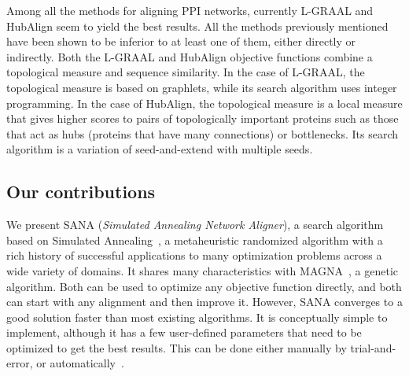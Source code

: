 \documentclass{bioinfo}
\begin{document}
Among all the methods for aligning PPI networks, currently L-GRAAL \citep{LGRAAL} and HubAlign \citep{HubAlign} seem to yield the best results. All the methods previously mentioned have been shown to be inferior to at least one of them, either directly or indirectly. Both the L-GRAAL and HubAlign objective functions combine a topological measure and sequence similarity. In the case of L-GRAAL, the topological measure is based on graphlets, while its search algorithm uses integer programming. In the case of HubAlign, the topological measure is a local measure that gives higher scores to pairs of topologically important proteins such as those that act as hubs (proteins that have many connections) or bottlenecks. Its search algorithm is a variation of seed-and-extend with multiple seeds.

\subsection{Our contributions}

We present SANA (\textit{Simulated Annealing Network Aligner}), a search algorithm based on Simulated Annealing~\citep{SA1,SA2}, a metaheuristic randomized algorithm with a rich history of successful applications to many optimization problems across a wide variety of domains.
It shares many characteristics with MAGNA~\citep{MAGNA}, a genetic algorithm. Both can be used to optimize any objective function directly, and both can start with any alignment and then improve it. However, SANA converges to a good solution faster than most existing algorithms.
It is conceptually simple to implement, although it has a few user-defined parameters that need to be optimized to get the best results. This can be done either manually by trial-and-error, or automatically~\citep{autosa}.
\end{document}
